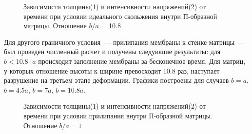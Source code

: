 				\begin{figure}[h!]	
				\def\svgwidth{\columnwidth}
				\caption{Зависимости толщины(1) и интенсивности напряжений(2) от времени при условии идеального скольжения внутри П-образной матрицы. Отношение $b/a$ = 10.8} 
				\label{vert_sliging_10ba}
		\end{figure}

Для другого граничного условия~--- прилипания мембраны к стенке матрицы~--- был проведен численный расчет и получены следующие результаты:
для \linebreak$b<10.8\cdot a$ происходит заполнение мембраны за бесконечное время. Для матриц, у которых отношение высоты к ширине превосходит
10.8 раз, наступает разрушение на третьем этапе деформации. Графики построены для случаев $b=a$, $b=4.5a$, $b=7a$, $b=10.8a$.
 
						 
		\begin{figure}[h!]	
				\def\svgwidth{\columnwidth}
				\caption{Зависимости толщины(1) и интенсивности напряжений(2) от времени при условии прилипания внутри П-образной матрицы. Отношение $b/a = 1$} 
				\label{vert_stick_ba}
		\end{figure}

